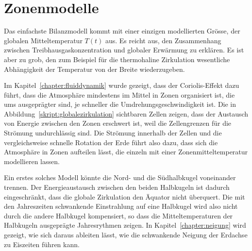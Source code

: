 %
%
%
\section{Zonenmodelle}
Das einfachste Bilanzmodell kommt mit einer einzigen modellierten
Grösse, der globalen Mitteltemperatur $T(t)$ aus.
Es reicht aus, den Zusammenhang zwischen Treibhausgaskonzentration
und globaler Erwärmung zu erklären.
Es ist aber zu grob, den zum Beispiel für die thermohaline Zirkulation
wesentliche Abhängigkeit der Temperatur von der Breite wiederzugeben.

Im Kapitel~\ref{chapter:fluiddynamik} wurde gezeigt, dass der
Coriolis-Effekt dazu führt, dass die Atmosphäre mindestens im Mittel
in Zonen organisiert ist, die ums ausgeprägter sind, je schneller
die Umdrehungsgeschwindigkeit ist.
Die in Abbildung~\ref{skript:globalezirkulation} sichtbaren Zellen
zeigen, dass der Austausch von Energie zwischen den Zonen erschwert
ist, weil die Zellengrenzen für die Strömung undurchlässig sind.
Die Strömung innerhalb der Zellen und die vergleichsweise schnelle
Rotation der Erde führt also dazu, dass sich die Atmosphäre in
Zonen aufteilen lässt, die einzeln mit einer Zonenmitteltemperatur
modellieren lassen.

Ein erstes solches Modell könnte die Nord- und die Südhalbkugel voneinander
trennen.
Der Energieaustausch zwischen den beiden Halbkugeln ist dadurch 
eingeschränkt, dass die globale Zirkulation den Äquator nicht überquert.
Die mit den Jahreszeiten schwankende Einstrahlung auf eine Halbkugel
wird also nicht durch die andere Halbkugel kompensiert, so dass die
Mitteltemperaturen der Halbkugeln ausgeprägte Jahresrythmen zeigen.
In Kapitel~\ref{chapter:neigung} wird gezeigt, wie sich daraus ableiten
lässt, wie die schwankende Neigung der Erdachse zu Eiszeiten führen kann.

